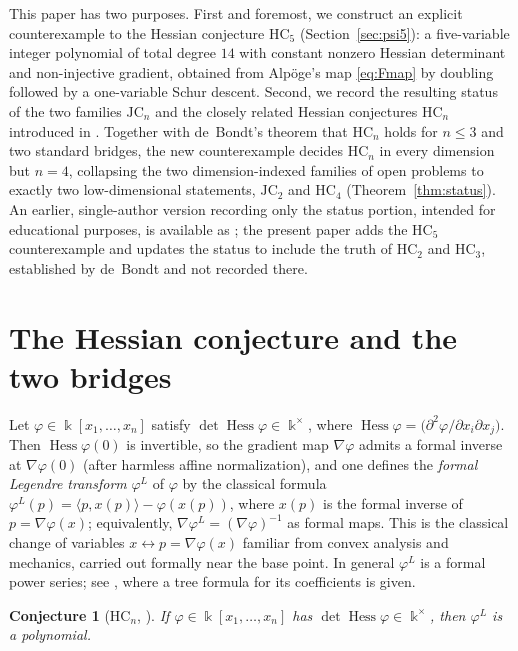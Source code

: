 \documentclass[11pt]{article}
\theoremstyle{plain}
\newtheorem{conjecture}[theorem]{Conjecture}
\theoremstyle{definition}
\newcommand{\kk}{\Bbbk}
\newcommand{\JC}{\mathrm{JC}}
\newcommand{\HC}{\mathrm{HC}}
\newcommand{\Hess}{\operatorname{Hess}}
\begin{document}
This paper has two purposes. First and foremost, we construct an
explicit counterexample to the Hessian conjecture $\HC_5$
(Section~\ref{sec:psi5}): a five-variable integer polynomial of total degree
$14$ with constant nonzero Hessian determinant and non-injective
gradient, obtained from Alp\"oge's map \eqref{eq:Fmap} by doubling
followed by a one-variable Schur descent. Second, we record the resulting status of
the two families $\JC_n$ and the closely related Hessian conjectures
$\HC_n$ introduced in \cite{Meng2006}. Together with de~Bondt's theorem
that $\HC_n$ holds for $n\le3$ \cite{deBondt2012} and two standard
bridges, the new counterexample decides $\HC_n$ in every dimension but
$n=4$, collapsing the two dimension-indexed families of open problems to
exactly two low-dimensional statements, $\JC_2$ and $\HC_4$
(Theorem~\ref{thm:status}). An earlier, single-author version recording
only the status portion, intended for educational purposes, is
available as \cite{MengRG2026}; the present paper adds the $\HC_5$
counterexample and updates the status to include the truth of $\HC_2$
and $\HC_3$, established by de~Bondt \cite{deBondt2012} and not recorded
there.

\section{The Hessian conjecture and the two bridges}

Let $\varphi\in\kk[x_1,\dots,x_n]$ satisfy
$\det\Hess\varphi\in\kk^{\times}$, where
$\Hess\varphi=\bigl(\partial^2\varphi/\partial x_i\partial
x_j\bigr)$. Then $\Hess\varphi(0)$ is invertible, so the gradient map
$\nabla\varphi$ admits a formal inverse at $\nabla\varphi(0)$ (after
harmless affine normalization), and one defines the \emph{formal
Legendre transform} $\varphi^{L}$ of $\varphi$ by the classical formula
$\varphi^{L}(p)=\langle p,x(p)\rangle-\varphi(x(p))$, where $x(p)$ is
the formal inverse of $p=\nabla\varphi(x)$; equivalently,
$\nabla\varphi^{L}=(\nabla\varphi)^{-1}$ as formal maps. This is the
classical change of variables $x\leftrightarrow p=\nabla\varphi(x)$
familiar from convex analysis and mechanics, carried out formally near
the base point. In general
$\varphi^{L}$ is a formal power series; see \cite{Meng2006}, where a
tree formula for its coefficients is given.

\begin{conjecture}[$\HC_n$, \cite{Meng2006}]
If $\varphi\in\kk[x_1,\dots,x_n]$ has
$\det\Hess\varphi\in\kk^{\times}$, then $\varphi^{L}$ is a polynomial.
\end{conjecture}
\end{document}
